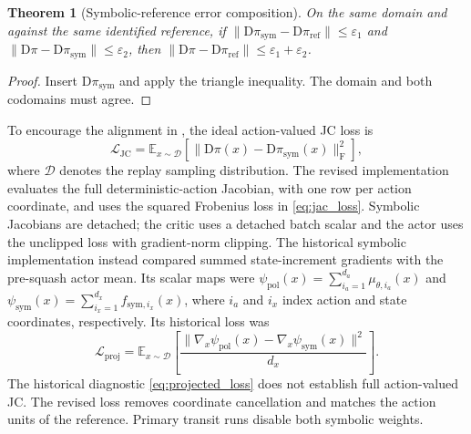 \documentclass[10pt]{article}
\newtheorem{theorem}{Theorem}[section]
\begin{document}
\begin{theorem}[Symbolic-reference error composition]
\label{thm:sindy_jac}
On the same domain and against the same identified reference, if
$\|\mathrm{D}\pi_{\mathrm{sym}}-\mathrm{D}\pi_{\mathrm{ref}}\|\leq\varepsilon_1$
and
$\|\mathrm{D}\pi-\mathrm{D}\pi_{\mathrm{sym}}\|\leq\varepsilon_2$,
then $\|\mathrm{D}\pi-\mathrm{D}\pi_{\mathrm{ref}}\|\leq\varepsilon_1+\varepsilon_2$.
\end{theorem}
\begin{proof}
Insert $\mathrm{D}\pi_{\mathrm{sym}}$ and apply the triangle inequality. The domain and both codomains must agree.
\end{proof}

To encourage the alignment in , the ideal action-valued JC loss is
\begin{equation}
\mathcal{L}_{\mathrm{JC}}=
\mathbb{E}_{x\sim\mathcal{D}}\!
\left[\|\mathrm{D}\pi(x)-\mathrm{D}\pi_{\mathrm{sym}}(x)\|_{\mathrm F}^{2}\right],
\label{eq:jac_loss}
\end{equation}
where $\mathcal{D}$ denotes the replay sampling distribution. The revised implementation evaluates the full deterministic-action Jacobian, with one row per action coordinate, and uses the squared Frobenius loss in \eqref{eq:jac_loss}. Symbolic Jacobians are detached; the critic uses a detached batch scalar and the actor uses the unclipped loss with gradient-norm clipping. The historical symbolic implementation instead compared summed state-increment gradients with the pre-squash actor mean. Its scalar maps were
$\psi_{\mathrm{pol}}(x)=\sum_{i_a=1}^{d_a}\mu_{\theta,i_a}(x)$ and
$\psi_{\mathrm{sym}}(x)=\sum_{i_x=1}^{d_x}f_{\mathrm{sym},i_x}(x)$,
where $i_a$ and $i_x$ index action and state coordinates, respectively.
Its historical loss was
\begin{equation}
\mathcal{L}_{\mathrm{proj}}=
\mathbb{E}_{x\sim\mathcal{D}}\!
\left[\frac{\|\nabla_x\psi_{\mathrm{pol}}(x)
-\nabla_x\psi_{\mathrm{sym}}(x)\|^2}{d_x}\right].
\label{eq:projected_loss}
\end{equation}
The historical diagnostic \eqref{eq:projected_loss} does not establish full action-valued JC. The revised loss removes coordinate cancellation and matches the action units of the reference. Primary transit runs disable both symbolic weights.
\end{document}
